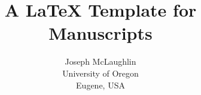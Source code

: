 \title{A {\LaTeX} Template for Manuscripts}
\author{Joseph McLaughlin \\
        University of Oregon \\ 
        Eugene, USA}